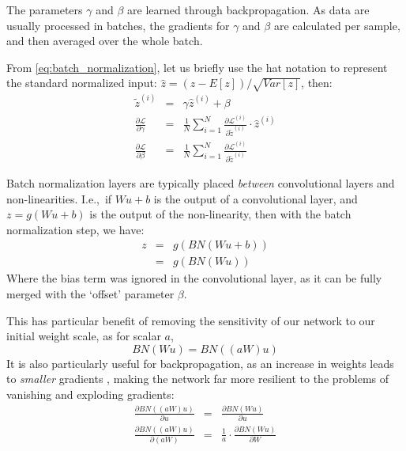       The parameters $\gamma$ and $\beta$ are learned through backpropagation.
      As data are usually processed in batches, the gradients for $\gamma$ and
      $\beta$ are calculated per sample, and then averaged over the whole
      batch.

      From \autoref{eq:batch_normalization}, let us briefly use the hat
      notation to represent the standard normalized input:
      $\hat{z} = (z-E[z])/\sqrt{Var[z]}$, then:
      \begin{eqnarray}
        \tilde{z}^{(i)} & = & \gamma \hat{z}^{(i)} + \beta \nonumber\\
        \frac{\partial \mathcal{L}}{\partial \gamma}& =&
        \frac{1}{N}\sum_{i=1}^{N} \frac{\partial
        \mathcal{L}^{(i)}}{\partial \tilde{z}^{(i)}} \cdot \hat{z}^{(i)} \\
        \frac{\partial \mathcal{L}}{\partial \beta}& =&
        \frac{1}{N}\sum_{i=1}^{N} \frac{\partial
        \mathcal{L}^{(i)}}{\partial \tilde{z}^{(i)}} 
      \end{eqnarray}

      Batch normalization layers are typically placed \emph{between} convolutional layers
      and non-linearities. I.e.,\ if $Wu+b$ is the output of a convolutional
      layer, and $z=g(Wu+b)$ is the output of the non-linearity, then with the
      batch normalization step, we have:
      \begin{eqnarray}
        z &=& g(BN(Wu+b)) \nonumber\\
          &=& g(BN(Wu))
      \end{eqnarray}
      Where the bias term was ignored in the convolutional layer, as it can be
      fully merged with the `offset' parameter $\beta$.

      This has particular benefit of removing the sensitivity of our network to
      our initial weight scale, as for scalar $a$,
      \begin{equation}
        BN(Wu) = BN((aW)u)
      \end{equation}
      It is also particularly useful for backpropagation, as an increase in
      weights leads to \emph{smaller} gradients \citep{ioffe_batch_2015}, making
      the network far more resilient to the problems of vanishing and exploding
      gradients:
      \begin{eqnarray}
        \frac{\partial BN((aW)u)}{\partial u} & = & \frac{\partial
        BN(Wu)}{\partial u} \nonumber\\
        \frac{\partial BN((aW)u)}{\partial (aW)} & = & \frac{1}{a} \cdot \frac{\partial
        BN(Wu)}{\partial W} 
      \end{eqnarray}


